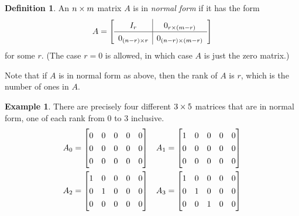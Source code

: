 \documentclass[reqno]{amsart}
\theoremstyle{definition}
\newtheorem{definition}[theorem]{Definition}
\newtheorem{example}[theorem]{Example}
\newcommand{\dfn}[1]{\emph{{#1}}\index{#1}}
\begin{document}
\begin{definition}\label{defn-normal-form}
 An $n\times m$ matrix $A$ is in \dfn{normal form} if it has the form
 \[ A = {\renewcommand{\arraystretch}{1.3}
     \left[\begin{array}{c|c}
      I_r & 0_{r\tm (m-r)} \\ \hline
      0_{(n-r)\tm r} & 0_{(n-r)\tm(m-r)}
     \end{array}\right]}
 \]
 for some $r$.  (The case $r=0$ is allowed, in which case $A$ is just
 the zero matrix.)
\end{definition}

Note that if $A$ is in normal form as above, then the rank of $A$ is
$r$, which is the number of ones in $A$.

\begin{example}\label{eg-normal-form}
 There are precisely four different $3\times 5$ matrices that are in
 normal form, one of each rank from $0$ to $3$ inclusive.
 \begin{align*}
  A_0 &= \bbm 0&0&0&0&0 \\ 0&0&0&0&0 \\ 0&0&0&0&0 \ebm &
  A_1 &= \bbm 1&0&0&0&0 \\ 0&0&0&0&0 \\ 0&0&0&0&0 \ebm \\
  A_2 &= \bbm 1&0&0&0&0 \\ 0&1&0&0&0 \\ 0&0&0&0&0 \ebm &
  A_3 &= \bbm 1&0&0&0&0 \\ 0&1&0&0&0 \\ 0&0&1&0&0 \ebm
 \end{align*}
\end{example}
\end{document}
